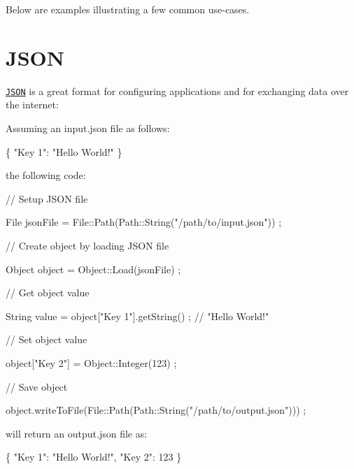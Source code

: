 Below are examples illustrating a few common use-\/cases.\hypertarget{md_docs__tutorial_JSON}{}\section{J\+S\+ON}\label{md_docs__tutorial_JSON}
\href{https://en.wikipedia.org/wiki/JSON}{\tt J\+S\+ON} is a great format for configuring applications and for exchanging data over the internet\+:

Assuming an {\ttfamily input.\+json} file as follows\+:


\begin{DoxyCode}
\{
    "Key 1": "Hello World!"
\}
\end{DoxyCode}


the following code\+:


\begin{DoxyCode}
\textcolor{comment}{// Setup JSON file}

File jsonFile = File::Path(Path::String(\textcolor{stringliteral}{"/path/to/input.json"})) ;

\textcolor{comment}{// Create object by loading JSON file}

Object \textcolor{keywordtype}{object} = Object::Load(jsonFile) ;

\textcolor{comment}{// Get object value}

String value = \textcolor{keywordtype}{object}[\textcolor{stringliteral}{"Key 1"}].getString() ; \textcolor{comment}{// "Hello World!"}

\textcolor{comment}{// Set object value}

\textcolor{keywordtype}{object}[\textcolor{stringliteral}{"Key 2"}] = Object::Integer(123) ;

\textcolor{comment}{// Save object}

\textcolor{keywordtype}{object}.writeToFile(File::Path(Path::String(\textcolor{stringliteral}{"/path/to/output.json"}))) ;
\end{DoxyCode}


will return an {\ttfamily output.\+json} file as\+:


\begin{DoxyCode}
\{
    "Key 1": "Hello World!",
    "Key 2": 123
\}
\end{DoxyCode}
 